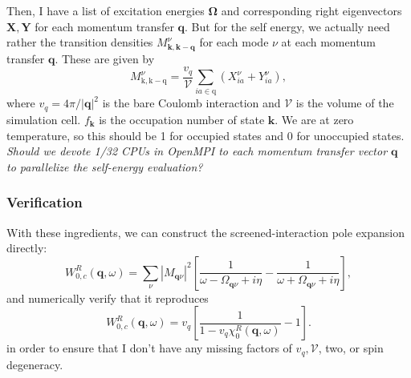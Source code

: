 Then, I have a list of excitation energies $\bm{\Omega}$ and corresponding right eigenvectors $\bm{X}, \bm{Y}$ for each momentum transfer $\bm{q}$. But for the self energy, we actually need rather the transition densities $M_{\bm{k}, \bm{k}-\bm{q}}^\nu$ for each mode $\nu$ at each momentum transfer $\bm{q}$. These are given by
\begin{equation}
M_{\mathrm{k}, \mathrm{k}-\mathrm{q}}^\nu=\frac{v_q}{\mathcal{V}} \sum_{i a \in \mathrm{q}}\left(X_{i a}^\nu+Y_{i a}^\nu\right),
\end{equation}
where $v_q = 4\pi/|\bm{q}|^2$ is the bare Coulomb interaction and $\mathcal{V}$ is the volume of the simulation cell. $f_{\bm{k}}$ is the occupation number of state $\bm{k}$. We are at zero temperature, so this should be 1 for occupied states and 0 for unoccupied states. \emph{Should we devote 1/32 CPUs in OpenMPI to each momentum transfer vector $\bm{q}$ to parallelize the self-energy evaluation?}
\subsubsection{Verification}
With these ingredients, we can construct the screened-interaction pole expansion directly:
$$
W_{0, c}^R(\mathbf{q}, \omega)=\sum_\nu\left|M_{\mathbf{q} \nu}\right|^2\left[\frac{1}{\omega-\Omega_{\mathbf{q} \nu}+i \eta}-\frac{1}{\omega+\Omega_{\mathbf{q} \nu}+i \eta}\right],
$$
and numerically verify that it reproduces
$$
W_{0, c}^R(\mathbf{q}, \omega)=v_q\left[\frac{1}{1-v_q \chi_0^R(\mathbf{q}, \omega)}-1\right] .
$$
in order to ensure that I don't have any missing factors of $v_q, \mathcal{V}$, two, or spin degeneracy.

